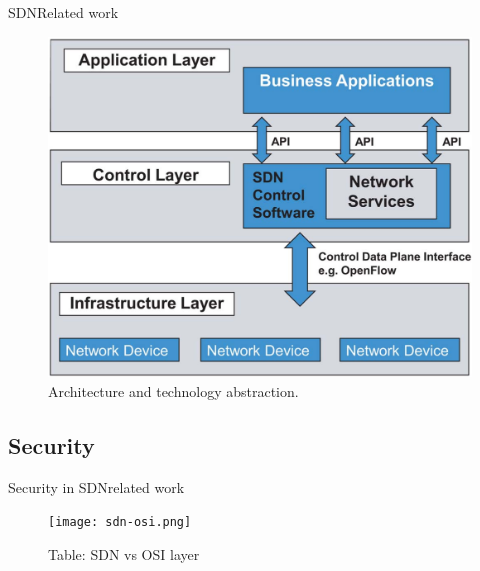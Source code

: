 \begin{frame}{SDN}{Related work}
			\begin{center}
			
				\begin{figure}
					\includegraphics[width=.7\columnwidth]{res/sdn2.png}
					\caption{\label{fig:sdn2} Architecture and technology abstraction.}
				\end{figure}
				
			\end{center}
%		
%		
%				
%				
%			
	

\end{frame}

\subsection{Security}

\begin{frame}{Security in SDN}{related work}

	\begin{figure}
		\texttt{[image: sdn-osi.png]}
		\caption*{Table: \label{fig:sdn-osi}SDN vs OSI layer}
	\end{figure}

\end{frame}


